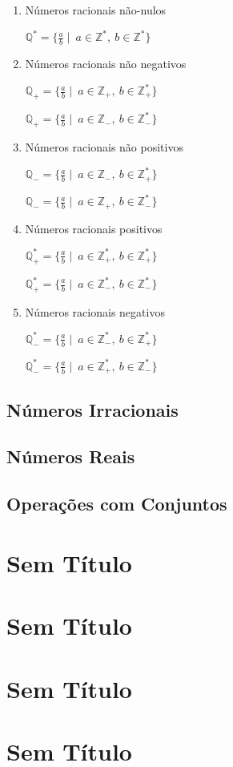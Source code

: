 \documentclass[]{book}
\begin{document}
\begin{enumerate}
\def\labelenumi{\arabic{enumi}.}
\item
  Números racionais não-nulos

  \(\mathbb{Q}^{*} = \{ \frac{a}{b} \mid \ a \in \mathbb{Z}^{*},\ b \in \mathbb{Z}^{*} \}\)
\item
  Números racionais não negativos

  \(\mathbb{Q}_{+} = \{ \frac{a}{b} \mid \ a \in \mathbb{Z}_{+},\ b \in \mathbb{Z}_{+}^{*} \}\)

  \(\mathbb{Q}_{+} = \{ \frac{a}{b} \mid \ a \in \mathbb{Z}_{-},\ b \in \mathbb{Z}_{-}^{*} \}\)
\item
  Números racionais não positivos

  \(\mathbb{Q}_{-} = \{ \frac{a}{b} \mid \ a \in \mathbb{Z}_{-},\ b \in \mathbb{Z}_{+}^{*} \}\)

  \(\mathbb{Q}_{-} = \{ \frac{a}{b} \mid \ a \in \mathbb{Z}_{+},\ b \in \mathbb{Z}_{-}^{*} \}\)
\item
  Números racionais positivos

  \(\mathbb{Q}_{+}^{*} = \{ \frac{a}{b} \mid \ a \in \mathbb{Z}_{+}^{*},\ b \in \mathbb{Z}_{+}^{*} \}\)

  \(\mathbb{Q}_{+}^{*} = \{ \frac{a}{b} \mid \ a \in \mathbb{Z}_{-}^{*},\ b \in \mathbb{Z}_{-}^{*} \}\)
\item
  Números racionais negativos

  \(\mathbb{Q}_{-}^{*} = \{ \frac{a}{b} \mid \ a \in \mathbb{Z}_{-}^{*},\ b \in \mathbb{Z}_{+}^{*} \}\)

  \(\mathbb{Q}_{-}^{*} = \{ \frac{a}{b} \mid \ a \in \mathbb{Z}_{+}^{*},\ b \in \mathbb{Z}_{-}^{*} \}\)
\end{enumerate}

\section{Números Irracionais}\label{numeros-irracionais}

\section{Números Reais}\label{numeros-reais}

\section{Operações com Conjuntos}\label{operacoes-com-conjuntos}

\chapter{Sem Título}\label{sem-titulo}

\chapter{Sem Título}\label{sem-titulo-1}

\chapter{Sem Título}\label{sem-titulo-2}

\chapter{Sem Título}\label{sem-titulo-3}


\end{document}
